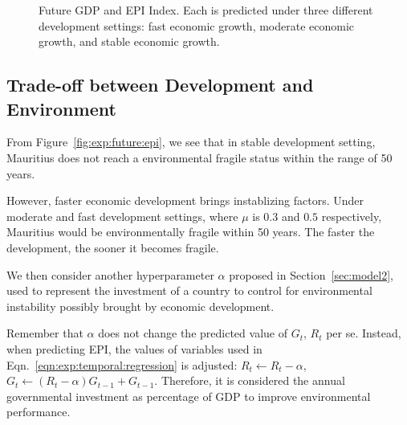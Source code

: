 \begin{figure}[htbp]
    \centering
    \caption{Future GDP and EPI Index. Each is predicted under three different development settings: fast economic growth, moderate economic growth, and stable economic growth.}
    \label{fig:exp:future}
\end{figure}

\subsection{Trade-off between Development and Environment} 
From Figure~\ref{fig:exp:future:epi}, we see that in stable development setting, Mauritius does not reach a environmental fragile status within the range of 50 years.

However, faster economic development brings instablizing factors. Under moderate and fast development settings, where $\mu$ is $0.3$ and $0.5$ respectively, Mauritius would be environmentally fragile within 50 years. The faster the development, the sooner it becomes fragile.

We then consider another hyperparameter $\alpha$ proposed in Section~\ref{sec:model2}, used to represent the investment of a country to control for environmental instability possibly brought by economic development.

Remember that $\alpha$ does not change the predicted value of $G_t$, $R_t$ per se. Instead, when predicting EPI, the values of variables used in Eqn.~\ref{eqn:exp:temporal:regression} is adjusted: $R_t\leftarrow R_t-\alpha$, $G_t\leftarrow (R_t-\alpha)G_{t-1}+G_{t-1}$. Therefore, it is considered the annual governmental investment as percentage of GDP to improve environmental performance.

